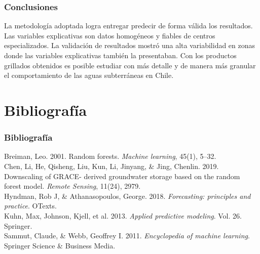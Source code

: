 \documentclass{beamer}
\begin{document}
  \begin{frame}
    \frametitle{Conclusiones}

    \begin{outline}
      \1 La metodología adoptada logra entregar predecir de forma válida los resultados.
      \1 Las variables explicativas son datos homogéneos y fiables de centros especializados.
      \1 La validación de resultados mostró una alta variabilidad en zonas donde las variables explicativas también la presentaban.
      \1 Con los productos grillados obtenidos es posible estudiar con más detalle y de manera más granular el comportamiento
      de las aguas subterráneas en Chile.
      
    \end{outline}
  \end{frame}

  \section*{Bibliografía}

  \begin{frame}
    \frametitle{Bibliografía}
    \small
    \begin{outline}
    \1 Breiman, Leo. 2001. Random forests. \textit{Machine learning}, 45(1), 5–32.\\
    \1 Chen, Li, He, Qisheng, Liu, Kun, Li, Jinyang, \& Jing, Chenlin. 2019. Downscaling of GRACE-
    derived groundwater storage based on the random forest model. \textit{Remote Sensing}, 11(24),
    2979.\\
    \1 Hyndman, Rob J, \& Athanasopoulos, George. 2018. \textit{Forecasting: principles and practice}.
    OTexts.\\
    \1 Kuhn, Max, Johnson, Kjell, et al. 2013. \textit{Applied predictive modeling}. Vol. 26. Springer.\\
    \1 Sammut, Claude, \& Webb, Geoffrey I. 2011. \textit{Encyclopedia of machine learning}. Springer
    Science \& Business Media.\\
    \end{outline}
    
  \end{frame}

  \section{}

  \frame{\titlepage}
\end{document}
